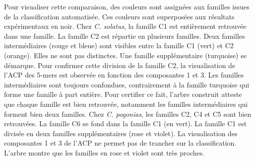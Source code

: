 \documentclass[12pt,a4paper]{article}
\begin{document}
			Pour visualiser cette comparaison, des couleurs sont assignées aux familles issues de la classification automatisée. Ces couleurs sont superposées aux résultats expérimentaux en noir.  Chez \textit{C. solatus}, la famille C1 est entièrement retrouvée dans une famille. La famille C2 est répartie en plusieurs familles. Deux familles intermédiaires (rouge et bleue) sont visibles entre la famille C1 (vert)  et C2 (orange). Elles ne sont pas distinctes.  Une famille supplémentaire (turquoise) se démarque. Pour confirmer cette division de la famille C2, la visualisation de l'ACP des 5-mers est observée en fonction des composantes 1 et 3. Les familles intermédiaires sont toujours confondues, contrairement à la famille turquoise qui forme une famille à part entière. Pour certifier ce fait, l'arbre construit atteste que chaque famille est bien retrouvée, notamment les familles intermédiaires qui forment bien deux familles. Chez \textit{C. pogonias}, les familles C2, C4 et C5 sont bien retrouvées. La famille C6 se fond dans la famille C1 (en vert). La famille C1 est divisée en deux familles supplémentaires (rose et violet). La visualisation des composantes 1 et 3 de l'ACP ne permet pas de trancher sur la classification. L'arbre montre que les familles en rose et violet sont très proches.  
			 
\end{document}
